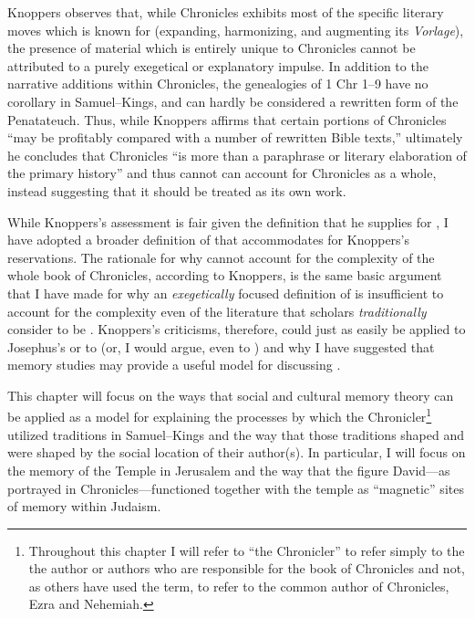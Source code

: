  Knoppers observes that, while Chronicles exhibits most of the specific literary moves which \rwb is known for (expanding, harmonizing, and augmenting its \emph{Vorlage}), the presence of material which is entirely unique to Chronicles cannot be attributed to a purely exegetical or explanatory impulse. In addition to the narrative additions within Chronicles, the genealogies of 1 Chr 1--9 have no corollary in Samuel--Kings, and can hardly be considered a rewritten form of the Penatateuch.\autocite[132]{knoppers2003} Thus, while Knoppers affirms that certain portions of Chronicles ``may be profitably compared with a number of rewritten Bible texts,''\autocite[131]{knoppers2003} ultimately he concludes that Chronicles ``is more than a paraphrase or literary elaboration of the primary history''\autocite[134]{knoppers2003} and thus \rwb cannot can account for Chronicles as a whole, instead suggesting that it should be treated as its own work.\autocite[131--134]{knoppers2003} 

 While Knoppers's assessment is fair given the definition that he supplies for \rwb, I have adopted a broader definition of \rwb that accommodates for Knoppers's reservations. The rationale for why \rwb cannot account for the complexity of the whole book of Chronicles, according to Knoppers, is the same basic argument that I have made for why an \emph{exegetically} focused definition of \rwb is insufficient to account for the complexity even of the literature that scholars \emph{traditionally} consider to be \rwb. Knoppers's criticisms, therefore, could just as easily be applied to Josephus's \ant or to \jub (or, I would argue, even to \ga) and why I have suggested that memory studies may provide a useful model for discussing \rwb. 

 This chapter will focus on the ways that social and cultural memory theory can be applied as a model for explaining the processes by which the Chronicler\footnote{Throughout this chapter I will refer to ``the   Chronicler'' to refer simply to the the author or authors who are   responsible for the book of Chronicles and not, as others have used   the term, to refer to the common author of Chronicles, Ezra and   Nehemiah.} utilized traditions in Samuel--Kings and the way that those traditions shaped and were shaped by the social location of their author(s). In particular, I will focus on the memory of the Temple in Jerusalem and the way that the figure David---as portrayed in Chronicles---functioned together with the temple as ``magnetic'' sites of memory within \secondtemple Judaism.\autocite[73]{benzvi_st2017} 

